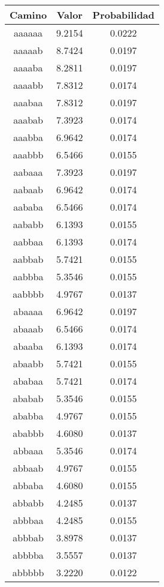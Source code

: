 \begin{figure}[hbpt]
\begin{minipage}{0.48\textwidth}
\begin{center}
\begin{tabular}{|c|c|c|}
\hline
\textbf{Camino} & \textbf{Valor} & \textbf{Probabilidad} \\
\hline
aaaaaa  &  9.2154  &  0.0222  \\
aaaaab  &  8.7424  &  0.0197  \\
aaaaba  &  8.2811  &  0.0197  \\
aaaabb  &  7.8312  &  0.0174  \\
aaabaa  &  7.8312  &  0.0197  \\
aaabab  &  7.3923  &  0.0174  \\
aaabba  &  6.9642  &  0.0174  \\
aaabbb  &  6.5466  &  0.0155  \\
aabaaa  &  7.3923  &  0.0197  \\
aabaab  &  6.9642  &  0.0174  \\
aababa  &  6.5466  &  0.0174  \\
aababb  &  6.1393  &  0.0155  \\
aabbaa  &  6.1393  &  0.0174  \\
aabbab  &  5.7421  &  0.0155  \\
aabbba  &  5.3546  &  0.0155  \\
aabbbb  &  4.9767  &  0.0137  \\
abaaaa  &  6.9642  &  0.0197  \\
abaaab  &  6.5466  &  0.0174  \\
abaaba  &  6.1393  &  0.0174  \\
abaabb  &  5.7421  &  0.0155  \\
ababaa  &  5.7421  &  0.0174  \\
ababab  &  5.3546  &  0.0155  \\
ababba  &  4.9767  &  0.0155  \\
ababbb  &  4.6080  &  0.0137  \\
abbaaa  &  5.3546  &  0.0174  \\
abbaab  &  4.9767  &  0.0155  \\
abbaba  &  4.6080  &  0.0155  \\
abbabb  &  4.2485  &  0.0137  \\
abbbaa  &  4.2485  &  0.0155  \\
abbbab  &  3.8978  &  0.0137  \\
abbbba  &  3.5557  &  0.0137  \\
abbbbb  &  3.2220  &  0.0122  \\


\end{tabular}
\end{center}
\end{minipage}
\end{figure}
